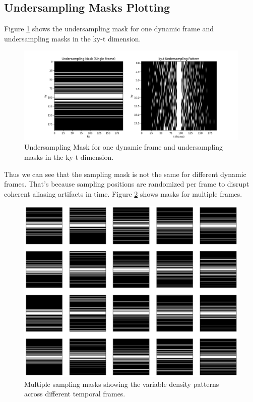 \documentclass{article}
\begin{document}
\subsection{Undersampling Masks Plotting}
Figure \ref{fig:undersampling_mask} shows the undersampling mask for one dynamic frame and undersampling masks in the ky-t dimension.

\begin{figure}[ht]
  \centering
  \includegraphics[width=\linewidth]{../assets/undersampling_mask.png}
  \caption{Undersampling Mask for one dynamic frame and undersampling masks in the ky-t dimension.}
  \label{fig:undersampling_mask}
\end{figure}

Thus we can see that the sampling mask is not the same for different dynamic frames.
That's because sampling positions are randomized per frame to disrupt coherent aliasing artifacts in time. Figure \ref{fig:multiple_masks} shows masks for multiple frames.

\begin{figure}[ht]
  \centering
  \includegraphics[width=0.8\linewidth]{../assets/mask.png}
  \caption{Multiple sampling masks showing the variable density patterns across different temporal frames.}
  \label{fig:multiple_masks}
\end{figure}
\end{document}
